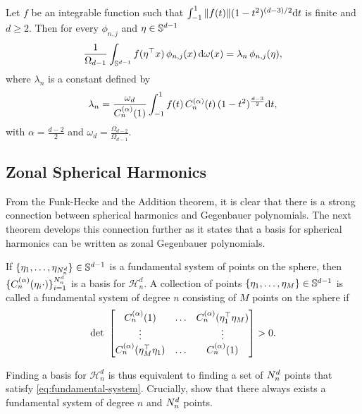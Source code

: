 \begin{theorem}
    Let $f$ be an integrable function such that $\int_{-1}^1 \| f(t)\| (1 - t^2)^{(d-3)/2} \mathrm{d}{t}$ is finite and $d \ge 2$. Then for every $\phi_{n,j}$  and $\eta \in \mathbb{S}^{d-1}$
    \begin{equation}
        \frac{1}{\Omega_{d-1}} \int_{\mathbb{S}^{d-1}} f(\eta^{\top} x)\,\phi_{n, j}(x)\, \mathrm{d}{\omega(x)} = {\lambda}_{n}\,\phi_{n,j}(\eta),
    \end{equation}
    where ${\lambda}_{n}$ is a constant defined by
    \begin{equation}
        \lambda_{n}  = 
        \frac{\omega_{d}}{C_n^{(\alpha)}(1)} \int_{-1}^1 f(t)\,C_n^{(\alpha)}(t)\,(1 - t^2)^{\frac{d-3}{2}} \mathrm{d}{t},
    \end{equation}
    with $\alpha = \frac{d-2}{2}$ and $\omega_d = \frac{\Omega_{d-2}}{\Omega_{d-1}}$.
\end{theorem}

\subsection{Zonal Spherical Harmonics}
\label{sec:zonal-spherical-harmonics}

From the Funk-Hecke and the Addition theorem, it is clear that there is a strong connection between spherical harmonics and Gegenbauer polynomials. The next theorem develops this connection further as it states that a basis for spherical harmonics can be written as zonal Gegenbauer polynomials. %

\begin{theorem}
    If $\{\eta_1, \ldots, \eta_{N^d_n} \} \in \mathbb{S}^{d-1}$ is a fundamental system of points on the sphere, then $\{C_n^{(\alpha)}(\eta_i \cdot)\}_{i=1}^{N^d_n}$ is a basis for $\mathcal{H}_n^d$. A collection of points $\{\eta_1, \ldots, \eta_M \} \in \mathbb{S}^{d-1}$ is called a fundamental system of degree $n$ consisting of $M$ points on the sphere if
    \begin{equation}
        \label{eq:fundamental-system}
        \textrm{det}\ 
        \begin{bmatrix}
            C_n^{(\alpha)}(1) & \ldots & C_n^{(\alpha)}(\eta_1\transpose\eta_M) \\
            \vdots & & \vdots \\
            C_n^{(\alpha)}(\eta_M\transpose\eta_1) & \ldots & C_n^{(\alpha)}(1)
        \end{bmatrix} > 0.
    \end{equation}
\end{theorem}
Finding a basis for $\mathcal{H}_n^d$ is thus equivalent to finding a set of $N^d_n$ points that satisfy \cref{eq:fundamental-system}. Crucially, \citet[Lemma~3]{dai2013} show that there always exists a fundamental system of degree $n$ and $N^d_n$ points.

